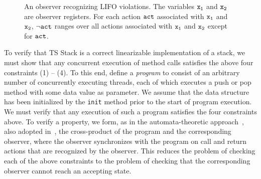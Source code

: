 \begin{figure}
\caption{An observer recognizing LIFO violations. The variables $\tt x_1$ and $\tt x_2$ are observer registers. For each action $\tt act$ associated with $\tt x_1$ and $\tt x_2$, $\tt \neg act$ ranges over all actions associated with $\tt x_1$ and $\tt x_2$ except for $\tt act$.  
}
\label{fig:lifostack:fig}
\end{figure}

To verify that TS Stack is a correct linearizable implementation of a stack, we
must show that any concurrent execution of method calls satisfies the
above four constraints (1) -- (4).
To this end, define a {\em program} to consist 
of an arbitrary number of concurrently executing threads,
%
each of which executes a push or pop method with some data value as parameter.
We assume that the data structure has been initialized
by the {\tt init} method prior to the start of program execution.
We must verify that any execution of such a program satisfies the four
constraints above. To verify a property, 
we form, as in the automata-theoretic approach~\cite{VW:modelchecking},
also adopted in~\cite{AHHR:integrated},
the cross-product of the program  and the corresponding
observer, where the observer synchronizes with the program on call and
return actions that are recognized by the observer. This reduces the
problem of checking each of the above constraints to the problem of checking
that the corresponding observer cannot reach an accepting state.

